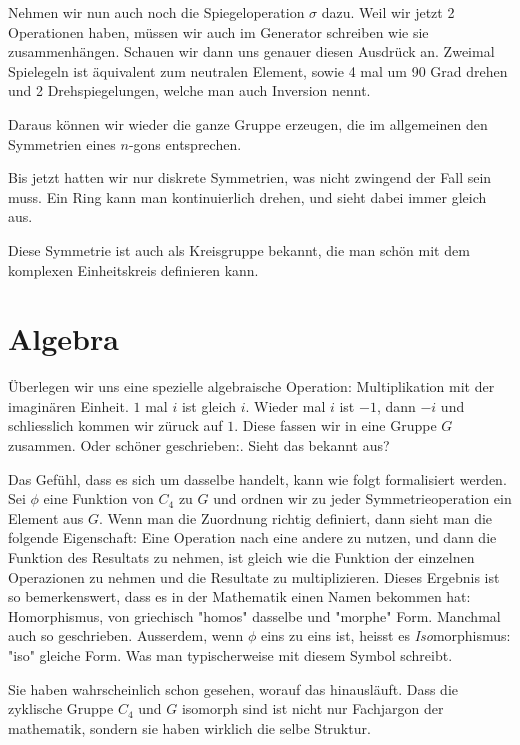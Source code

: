 \documentclass[a4paper]{article}
\newcommand{\scene}[1]{\par\noindent[ #1 ]\par}
\begin{document}
\scene{Diedergruppe}
Nehmen wir nun auch noch die Spiegeloperation \(\sigma\) dazu. Weil wir jetzt 2
Operationen haben, m\"ussen wir auch im Generator schreiben wie sie
zusammenh\"angen.  Schauen wir dann uns genauer diesen Ausdr\"uck an.  Zweimal
Spielegeln ist \"aquivalent zum neutralen Element, sowie 4 mal um 90 Grad
drehen und 2 Drehspiegelungen, welche man auch Inversion nennt.

\scene{Notation}
Daraus k\"onnen wir wieder die ganze Gruppe erzeugen, die im allgemeinen den
Symmetrien eines \(n\)-gons entsprechen.

\scene{Kreisgruppe}
Bis jetzt hatten wir nur diskrete Symmetrien, was nicht zwingend der Fall sein
muss. Ein Ring kann man kontinuierlich drehen, und sieht dabei immer gleich
aus.

Diese Symmetrie ist auch als Kreisgruppe bekannt, die man sch\"on mit dem
komplexen Einheitskreis definieren kann.

\section{Algebra}
\scene{Produkt mit \(i\)}
\"Uberlegen wir uns eine spezielle algebraische Operation: Multiplikation mit
der imagin\"aren Einheit. \(1\) mal \(i\) ist gleich \(i\). Wieder mal \(i\)
ist \(-1\), dann \(-i\) und schliesslich kommen wir z\"uruck auf \(1\).  Diese
fassen wir in eine Gruppe \(G\) zusammen. Oder sch\"oner geschrieben:. Sieht das
bekannt aus?

\scene{Morphismen}
Das Gefühl, dass es sich um dasselbe handelt, kann wie folgt formalisiert
werden.  Sei \(\phi\) eine Funktion von \(C_4\) zu \(G\) und ordnen wir zu
jeder Symmetrieoperation ein Element aus \(G\). Wenn man die Zuordnung richtig
definiert, dann sieht man die folgende Eigenschaft: Eine Operation nach eine
andere zu nutzen, und dann die Funktion des Resultats zu nehmen, ist gleich wie
die Funktion der einzelnen Operazionen zu nehmen und die Resultate zu
multiplizieren. Dieses Ergebnis ist so bemerkenswert, dass es in der Mathematik
einen Namen bekommen hat: Homorphismus, von griechisch "homos" dasselbe und
"morphe" Form.  Manchmal auch so geschrieben. Ausserdem, wenn \(\phi\) eins zu
eins ist, heisst es \emph{Iso}morphismus: "iso" gleiche Form. Was man
typischerweise mit diesem Symbol schreibt.

\scene{Animation}
Sie haben wahrscheinlich schon gesehen, worauf das hinausläuft.  Dass die
zyklische Gruppe \(C_4\) und \(G\) isomorph sind ist nicht nur Fachjargon der
mathematik, sondern sie haben wirklich die selbe Struktur.
\end{document}
